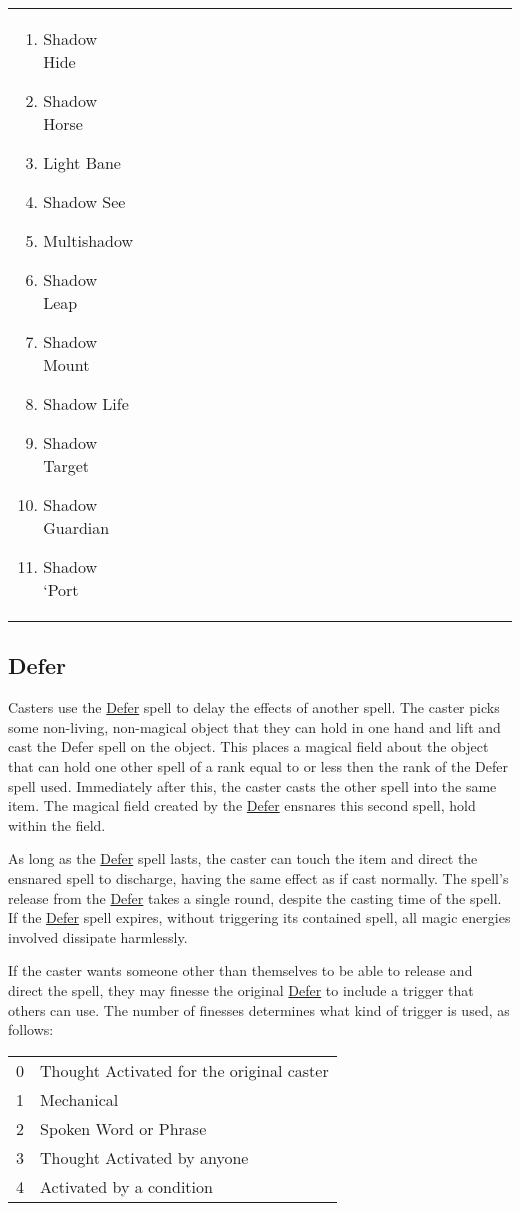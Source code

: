 \begin{tabular}{@{} p{0.25\linewidth} p{0.25\linewidth} p{0.25\linewidth} p{0.25\linewidth}}
\begin{enumerate}
\begin{enumerate}
		\item Shadow Hide
		\item Shadow Horse
		\item Light Bane
		\item Shadow See
		\item Multishadow
		\item Shadow Leap
		\item Shadow Mount
		\item Shadow Life
		\item Shadow Target
		\item Shadow Guardian
		\item Shadow ‘Port
	\end{enumerate}
\end{enumerate}
\end{tabular}
\pagebreak

\subsection{Defer}


Casters use the \ul{Defer} spell to delay the effects of another spell. The caster picks some non-living, non-magical object that they can hold in one hand and lift and cast the Defer spell on the object. This places a magical field about the object that can hold one other spell of a rank equal to or less then the rank of the Defer spell used. Immediately after this, the caster casts the other spell into the same item. The magical field created by the \ul{Defer} ensnares this second spell, hold within the field. 

As long as the \ul{Defer} spell lasts, the caster can touch the item and direct the ensnared spell to discharge, having the same effect as if cast normally. The spell’s release from the \ul{Defer} takes a single round, despite the casting time of the spell. If the \ul{Defer} spell expires, without triggering its contained spell, all magic energies involved dissipate harmlessly.

If the caster wants someone other than themselves to be able to release and direct the spell, they may finesse the original \ul{Defer} to include a trigger that others can use. The number of finesses determines what kind of trigger is used, as follows:

\begin{tabular}{@{} l l}
0 & Thought Activated for the original caster\\
1 & Mechanical\\
2 & Spoken Word or Phrase\\
3 & Thought Activated by anyone\\
4 & Activated by a condition
\end{tabular}

